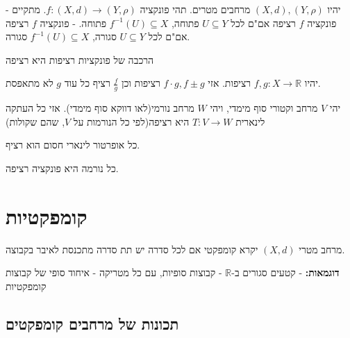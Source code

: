 \documentclass{tstextbook}
\begin{document}
\begin{proposition}
יהיו \((X,d),\left( Y,\rho \right)\) מרחבים מטרים. תהי פונקציה \(f:(X,d)\to\left( Y,\rho \right)\). מתקיים
- פונקציה \(f\) רציפה אם"ם לכל \(U\subseteq Y\) פתוחה, \(f^{-1}(U)\subseteq X\) פתוחה.
- פונקציה \(f\) רציפה אם"ם לכל \(U\subseteq Y\) סגורה, \(f^{-1}(U)\subseteq X\) סגורה.

\end{proposition}
\begin{proposition}
הרכבה של פונקציות רציפות היא רציפה

\end{proposition}
\begin{proposition}
יהיו \(f,g:X\to\mathbb{R}\) רציפות. אזי \(f\cdot g,f\pm g\) רציפות וכן \(\frac{f}{g}\) רציף כל עוד \(g\) לא מתאפסת.

\end{proposition}
\begin{proposition}
יהי \(V\) מרחב וקטורי סוף מימדי, ויהי \(W\) מרחב נורמי(לאו דווקא סוף מימדי). אזי כל העתקה לינארית \(T:V\to W\) היא רציפה(לפי כל הנורמות על \(V\), שהם שקולות)

\end{proposition}
\begin{proposition}
כל אופרטור לינארי חסום הוא רציף.

\end{proposition}
\begin{proposition}
כל נורמה היא פונקציה רציפה.

\end{proposition}
\section{קומפקטיות}

\begin{definition}
מרחב מטרי \((X,d)\) יקרא קומפקטי אם לכל סדרה יש תת סדרה מתכנסת לאיבר בקבוצה.

\end{definition}
\textbf{דוגמאות:}
- קטעים סגורים ב-\(\mathbb{R}\)
- קבוצות סופיות, עם כל מטריקה
- איחוד סופי של קבוצות קומפקטיות

\subsection{תכונות של מרחבים קומפקטים}
\end{document}
